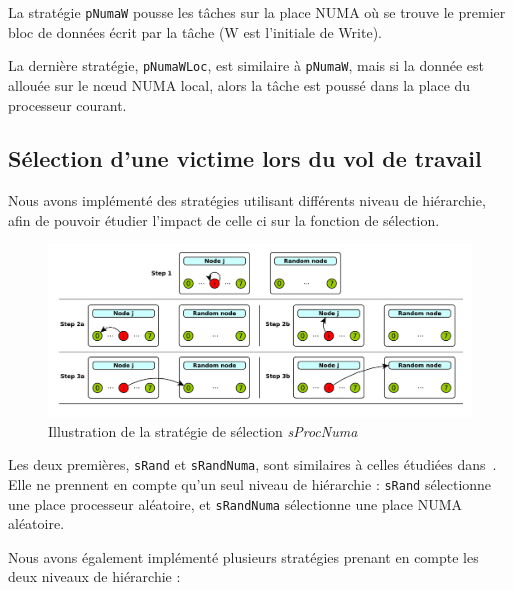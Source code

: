 \documentclass[parallelisme]{compas2016}
\begin{document}
La stratégie \verb/pNumaW/ pousse les tâches sur la place NUMA où se trouve
le premier bloc de données écrit par la tâche (W est l'initiale de Write).

La dernière stratégie, \verb/pNumaWLoc/, est similaire à \verb/pNumaW/, mais
si la donnée est allouée sur le nœud NUMA local, alors la tâche est poussé dans
la place du processeur courant.


\subsection{Sélection d'une victime lors du vol de travail}

Nous  avons implémenté des stratégies utilisant différents niveau de hiérarchie,
afin de pouvoir étudier l'impact de celle ci sur la fonction de sélection.

\begin{figure}[t]
  \centering
  \includegraphics[scale=0.5]{figures/strategies.pdf}
\vspace*{-3ex}
\caption{Illustration de la stratégie de sélection \emph{sProcNuma}}
\label{fig:strategies}
\vspace*{-5ex}
\end{figure}

Les deux premières, \verb/sRand/ et \verb/sRandNuma/, sont similaires à celles étudiées
dans~\cite{DBLP:journals/ijhpca/OlivierPWSP12}. Elle ne prennent en compte qu'un seul
niveau de hiérarchie : \verb/sRand/ sélectionne une place
processeur aléatoire, et \verb/sRandNuma/ sélectionne une place NUMA aléatoire.

Nous avons également implémenté plusieurs stratégies prenant en compte les deux niveaux
de hiérarchie :
\end{document}
